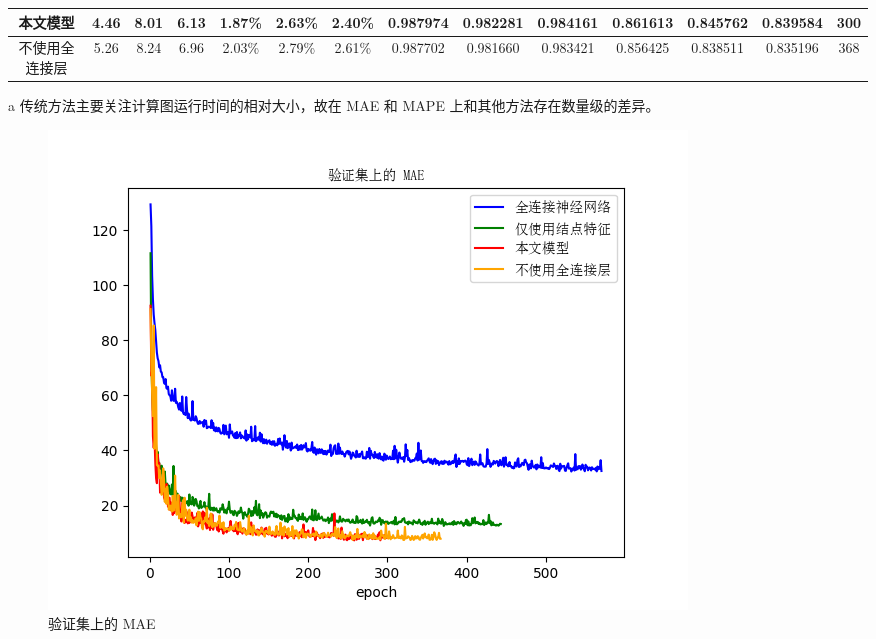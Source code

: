 \begin{table}[]
\begin{threeparttable}
{\begin{tabular}{|c|ccc|ccc|ccc|ccc|c|}
                本文模型                    & \multicolumn{1}{c|}{\textbf{4.46}} & \multicolumn{1}{c|}{\textbf{8.01}} & \textbf{6.13} & \multicolumn{1}{c|}{\textbf{1.87\%}} & \multicolumn{1}{c|}{\textbf{2.63\%}} & \textbf{2.40\%} & \multicolumn{1}{c|}{\textbf{0.987974}} & \multicolumn{1}{c|}{\textbf{0.982281}} & \textbf{0.984161} & \multicolumn{1}{c|}{\textbf{0.861613}} & \multicolumn{1}{c|}{\textbf{0.845762}} & \textbf{0.839584} & \textbf{300} \\ \hline
                不使用全连接层              & \multicolumn{1}{c|}{5.26}          & \multicolumn{1}{c|}{8.24}          & 6.96          & \multicolumn{1}{c|}{2.03\%}          & \multicolumn{1}{c|}{2.79\%}          & 2.61\%          & \multicolumn{1}{c|}{0.987702}          & \multicolumn{1}{c|}{0.981660}          & 0.983421          & \multicolumn{1}{c|}{0.856425}          & \multicolumn{1}{c|}{0.838511}          & 0.835196          & 368          \\ \hline
                \end{tabular}}
                \begin{tablenotes}
                    \footnotesize
                    \item[a] 传统方法主要关注计算图运行时间的相对大小，故在 MAE 和 MAPE 上和其他方法存在数量级的差异。
                \end{tablenotes}
    \end{threeparttable}

    \label{tab:table3}
\end{table}



\begin{figure}[H]
    \centering
    \includegraphics[scale=0.8]{figures/mae.png}
    \caption{验证集上的 MAE}
    \label{fig:graph9}
\end{figure}

